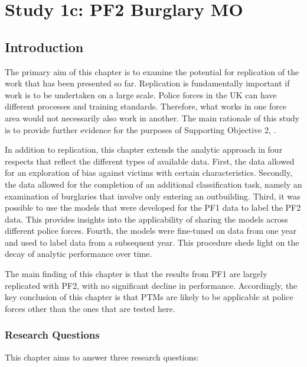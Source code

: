 \chapter{Study 1c: PF2 Burglary MO}

\section{Introduction} The primary aim of this chapter is to examine the potential for replication of the work that has been presented so far. Replication is fundamentally important if work is to be undertaken on a large scale. Police forces in the UK can have different processes and training standards. Therefore, what works in one force area would not necessarily also work in another. The main rationale of this study is to provide further evidence for the purposes of Supporting Objective 2, .
 
In addition to replication, this chapter extends the analytic approach in four respects that reflect the different types of available data. First, the data allowed for an exploration of bias against victims with certain characteristics. Secondly, the data allowed for the completion of an additional classification task, namely an examination of burglaries that involve only entering an outbuilding. Third, it was possible to use the models that were developed for the PF1 data to label the PF2 data. This provides insights into the applicability of sharing the models across different police forces. Fourth, the models were fine-tuned on data from one year and used to label data from a subsequent year. This procedure sheds light on the decay of analytic performance over time.

The main finding of this chapter is that the results from PF1 are largely replicated with PF2, with no significant decline in performance. Accordingly, the key conclusion of this chapter is that PTMs are likely to be applicable at police forces other than the ones that are tested here.

\subsection{Research Questions} This chapter aims to answer three research questions:

